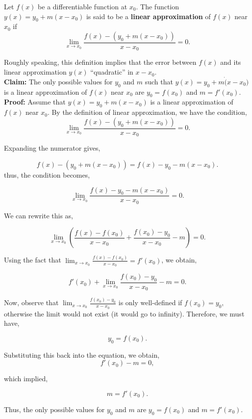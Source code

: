 \begin{tcolorbox}[colback=mylightblue, title = {\bf (Optional Read:) More Formal Definition of a Linear Approximation of a Function Near a Point}, breakable]

\begin{definition} Let \(f(x)\) be a differentiable function at \(x_0\). The function \(y(x) = y_0 + m(x - x_0)\) is said to be a \textbf{linear approximation} of \(f(x)\) near \(x_0\) if
\[
\lim_{x \to x_0} \frac{f(x) - \left( y_0 + m(x - x_0) \right)}{x - x_0} = 0.
\]
\end{definition}

Roughly speaking, this definition implies that the error between \( f(x) \) and its linear approximation \( y(x) \)  ``quadratic'' in $x -x_0$.\\

\textbf{Claim:} The only possible values for \( y_0 \) and \( m \) such that \( y(x) = y_0 + m \dot(x - x_0) \) is a linear approximation of \( f(x) \) near \( x_0 \) are \( y_0 = f(x_0) \) and \( m = f'(x_0) \). \\


\textbf{Proof:} Assume that \( y(x) = y_0 + m(x - x_0) \) is a linear approximation of \( f(x) \) near \( x_0 \). By the definition of linear approximation, we have the condition,
\[
\lim_{x \to x_0} \frac{f(x) - \left( y_0 + m(x - x_0) \right)}{x - x_0} = 0.
\]

Expanding the numerator gives,

\[
f(x) - \left( y_0 + m(x - x_0) \right) = f(x) - y_0 - m(x - x_0).
\]
thus, the condition becomes,

\[
\lim_{x \to x_0} \frac{f(x) - y_0 - m(x - x_0)}{x - x_0} = 0.
\]

We can rewrite this as,

\[
\lim_{x \to x_0} \left( \frac{f(x) - f(x_0)}{x - x_0} + \frac{f(x_0) - y_0}{x - x_0} - m \right) = 0.
\]

Using the fact that \( \lim_{x \to x_0} \frac{f(x) - f(x_0)}{x - x_0} = f'(x_0) \), we obtain,

\[
f'(x_0) + \lim_{x \to x_0} \frac{f(x_0) - y_0}{x - x_0} - m = 0.
\]

Now, observe that \( \lim_{x \to x_0} \frac{f(x_0) - y_0}{x - x_0} \) is only well-defined if \( f(x_0) = y_0 \), otherwise the limit would not exist (it would go to infinity). Therefore, we must have,

\[
y_0 = f(x_0).
\]

Substituting this back into the equation, we obtain,
\[
f'(x_0) - m = 0,
\]

which implied,

\[
m = f'(x_0).
\]

Thus, the only possible values for \( y_0 \) and \( m \) are \( y_0 = f(x_0) \) and \( m = f'(x_0) \).

\Qed
\end{tcolorbox}

